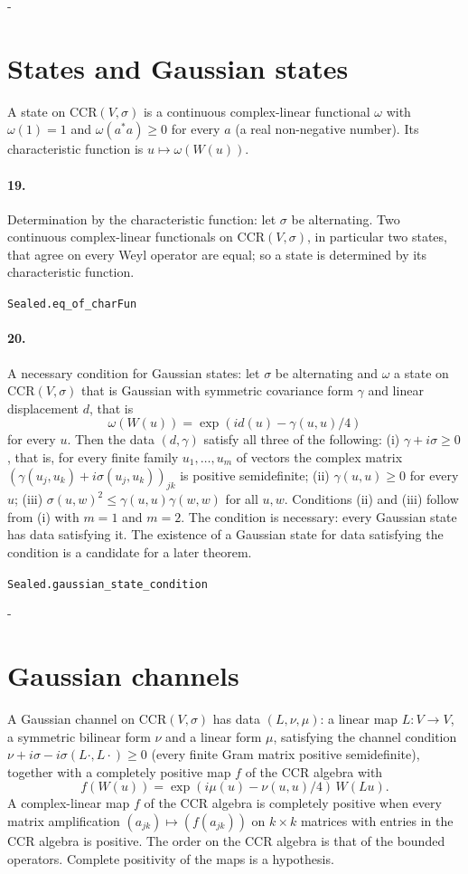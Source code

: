 \documentclass[11pt]{article}
\makeatletter
\newcommand{\keepspace}[1]{\par\penalty-100\begingroup\setlength{\dimen@}{#1}\dimen@ii\pagegoal\advance\dimen@ii-\pagetotal\ifdim\dimen@>\dimen@ii\ifdim\dimen@ii>\z@\vfil\fi\break\fi\endgroup}
\makeatother
\begin{document}
\keepspace{14\baselineskip}\section*{States and Gaussian states}
A state on $\mathrm{CCR}(V, \sigma)$ is a continuous complex-linear functional $\omega$ with $\omega(1) = 1$ and $\omega(a^* a) \ge 0$ for every $a$ (a real non-negative number). Its characteristic function is $u \mapsto \omega(W(u))$.

\paragraph{19.} Determination by the characteristic function: let $\sigma$ be alternating. Two continuous complex-linear functionals on $\mathrm{CCR}(V, \sigma)$, in particular two states, that agree on every Weyl operator are equal; so a state is determined by its characteristic function.\par{\footnotesize\texttt{Sealed.eq\_of\_charFun}}

\paragraph{20.} A necessary condition for Gaussian states: let $\sigma$ be alternating and $\omega$ a state on $\mathrm{CCR}(V, \sigma)$ that is Gaussian with symmetric covariance form $\gamma$ and linear displacement $d$, that is \[\omega(W(u)) = \exp(i d(u) - \gamma(u, u)/4)\] for every $u$. Then the data $(d, \gamma)$ satisfy all three of the following: (i) $\gamma + i\sigma \ge 0$, that is, for every finite family $u_1, \dots, u_m$ of vectors the complex matrix $(\gamma(u_j, u_k) + i \sigma(u_j, u_k))_{jk}$ is positive semidefinite; (ii) $\gamma(u, u) \ge 0$ for every $u$; (iii) $\sigma(u, w)^2 \le \gamma(u, u) \gamma(w, w)$ for all $u, w$. Conditions (ii) and (iii) follow from (i) with $m = 1$ and $m = 2$. The condition is necessary: every Gaussian state has data satisfying it. The existence of a Gaussian state for data satisfying the condition is a candidate for a later theorem.\par{\footnotesize\texttt{Sealed.gaussian\_state\_condition}}

\keepspace{14\baselineskip}\section*{Gaussian channels}
A Gaussian channel on $\mathrm{CCR}(V, \sigma)$ has data $(L, \nu, \mu)$: a linear map $L : V \to V$, a symmetric bilinear form $\nu$ and a linear form $\mu$, satisfying the channel condition $\nu + i\sigma - i\sigma(L\cdot, L\cdot) \ge 0$ (every finite Gram matrix positive semidefinite), together with a completely positive map $f$ of the CCR algebra with \[f(W(u)) = \exp(i\mu(u) - \nu(u, u)/4)\, W(Lu).\] A complex-linear map $f$ of the CCR algebra is completely positive when every matrix amplification $(a_{jk}) \mapsto (f(a_{jk}))$ on $k \times k$ matrices with entries in the CCR algebra is positive. The order on the CCR algebra is that of the bounded operators. Complete positivity of the maps is a hypothesis.
\end{document}
